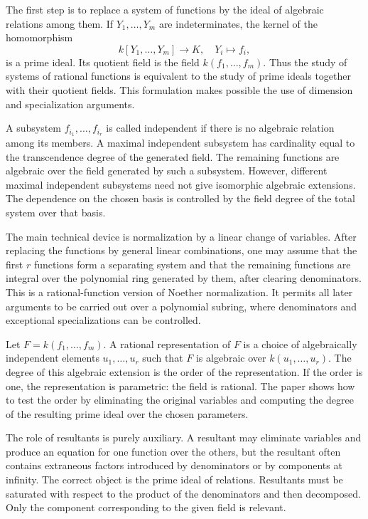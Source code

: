 \documentclass[12pt]{article}
\begin{document}
The first step is to replace a system of functions by the ideal of algebraic relations among them.
If \(Y_1, \ldots,Y_m\) are indeterminates, the kernel of the homomorphism \[
k[Y_1,\ldots,Y_m]\longrightarrow K,   \quad Y_i\mapsto f_i, \] is a prime ideal. Its quotient field
is the field \(k(f_1, \ldots,f_m)\). Thus the study of systems of rational functions is equivalent
to the study of prime ideals together with their quotient fields. This formulation makes possible
the use of dimension and specialization arguments.


A subsystem \(f_{i_1}, \ldots,f_{i_r}\) is called independent if there is no algebraic relation
among its members. A maximal independent subsystem has cardinality equal to the transcendence degree
of the generated field. The remaining functions are algebraic over the field generated by such a
subsystem. However, different maximal independent subsystems need not give isomorphic algebraic
extensions. The dependence on the chosen basis is controlled by the field degree of the total system
over that basis.


The main technical device is normalization by a linear change of variables. After replacing the
functions by general linear combinations, one may assume that the first \(r\) functions form a
separating system and that the remaining functions are integral over the polynomial ring generated
by them, after clearing denominators. This is a rational-function version of Noether normalization.
It permits all later arguments to be carried out over a polynomial subring, where denominators and
exceptional specializations can be controlled.


Let \(F=k(f_1, \ldots,f_m)\). A rational representation of \(F\) is a choice of algebraically
independent elements \(u_1, \ldots,u_r\) such that \(F\) is algebraic over \(k(u_1, \ldots,u_r)\).
The degree of this algebraic extension is the order of the representation. If the order is one, the
representation is parametric: the field is rational. The paper shows how to test the order by
eliminating the original variables and computing the degree of the resulting prime ideal over the
chosen parameters.


The role of resultants is purely auxiliary. A resultant may eliminate variables and produce an
equation for one function over the others, but the resultant often contains extraneous factors
introduced by denominators or by components at infinity. The correct object is the prime ideal of
relations. Resultants must be saturated with respect to the product of the denominators and then
decomposed. Only the component corresponding to the given field is relevant.
\end{document}
